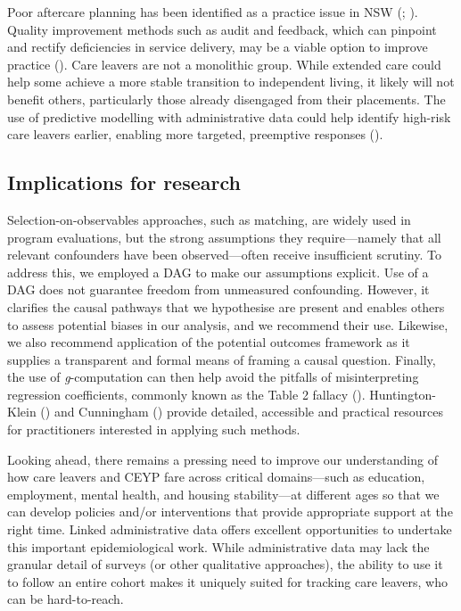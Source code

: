 \documentclass[
  jou,
  floatsintext,
  longtable,
  nolmodern,
  notxfonts,
  notimes,
  colorlinks=true,linkcolor=blue,citecolor=blue,urlcolor=blue]{apa7}
\begin{document}
Poor aftercare planning has been identified as a practice issue in NSW
(;
).
Quality improvement methods such as audit and feedback, which can
pinpoint and rectify deficiencies in service delivery, may be a viable
option to improve practice
(). Care leavers are not a monolithic group. While extended
care could help some achieve a more stable transition to independent
living, it likely will not benefit others, particularly those already
disengaged from their placements. The use of predictive modelling with
administrative data could help identify high-risk care leavers earlier,
enabling more targeted, preemptive responses
().

\subsection{Implications for research}\label{implications-for-research}

Selection-on-observables approaches, such as matching, are widely used
in program evaluations, but the strong assumptions they require---namely
that all relevant confounders have been observed---often receive
insufficient scrutiny. To address this, we employed a DAG to make our
assumptions explicit. Use of a DAG does not guarantee freedom from
unmeasured confounding. However, it clarifies the causal pathways that
we hypothesise are present and enables others to assess potential biases
in our analysis, and we recommend their use. Likewise, we also recommend
application of the potential outcomes framework as it supplies a
transparent and formal means of framing a causal question. Finally, the
use of \emph{g}-computation can then help avoid the pitfalls of
misinterpreting regression coefficients, commonly known as the Table 2
fallacy (). Huntington-Klein
()
and Cunningham
() provide
detailed, accessible and practical resources for practitioners
interested in applying such methods.

Looking ahead, there remains a pressing need to improve our
understanding of how care leavers and CEYP fare across critical
domains---such as education, employment, mental health, and housing
stability---at different ages so that we can develop policies and/or
interventions that provide appropriate support at the right time. Linked
administrative data offers excellent opportunities to undertake this
important epidemiological work. While administrative data may lack the
granular detail of surveys (or other qualitative approaches), the
ability to use it to follow an entire cohort makes it uniquely suited
for tracking care leavers, who can be hard-to-reach.
\end{document}
